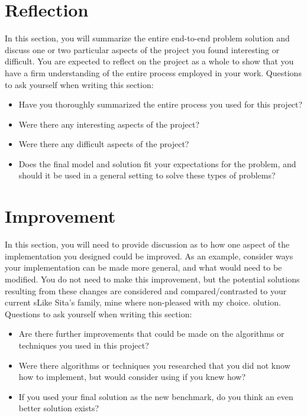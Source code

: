 \section*{Reflection}
In this section, you will summarize the entire end-to-end problem solution and discuss one or two particular aspects of the project you found interesting or difficult. You are expected to reflect on the project as a whole to show that you have a firm understanding of the entire process employed in your work. Questions to ask yourself when writing this section:
\begin{itemize}%
\item Have you thoroughly summarized the entire process you used for this project?
\item Were there any interesting aspects of the project?
\item Were there any difficult aspects of the project?
\item Does the final model and solution fit your expectations for the problem, and should it be used in a general setting to solve these types of problems?
\end{itemize}

\section*{Improvement}
In this section, you will need to provide discussion as to how one aspect of the implementation you designed could be improved. As an example, consider ways your implementation can be made more general, and what would need to be modified. You do not need to make this improvement, but the potential solutions resulting from these changes are considered and compared/contrasted to your current sLike Sita's family, mine where non-pleased with my choice. olution. Questions to ask yourself when writing this section:
\begin{itemize}%
\item Are there further improvements that could be made on the algorithms or techniques you used in this project?
\item Were there algorithms or techniques you researched that you did not know how to implement, but would consider using if you knew how?
\item If you used your final solution as the new benchmark, do you think an even better solution exists?
\end{itemize}